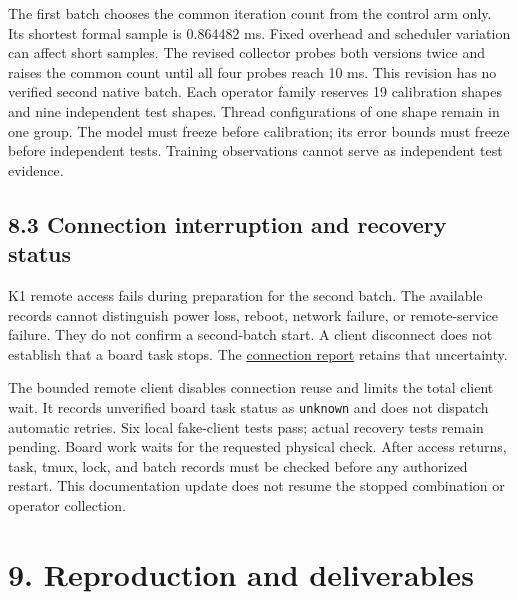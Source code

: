 \documentclass[10pt,a4paper]{article}
\begin{document}
The first batch chooses the common iteration count from the control arm
only. Its shortest formal sample is 0.864482 ms. Fixed overhead and
scheduler variation can affect short samples. The revised collector
probes both versions twice and raises the common count until all four
probes reach 10 ms. This revision has no verified second native batch.
Each operator family reserves 19 calibration shapes and nine independent
test shapes. Thread configurations of one shape remain in one group. The
model must freeze before calibration; its error bounds must freeze
before independent tests. Training observations cannot serve as
independent test evidence.

\hypertarget{connection-interruption-and-recovery-status}{%
\subsection{8.3 Connection interruption and recovery
status}\label{connection-interruption-and-recovery-status}}

K1 remote access fails during preparation for the second batch. The
available records cannot distinguish power loss, reboot, network
failure, or remote-service failure. They do not confirm a second-batch
start. A client disconnect does not establish that a board task stops.
The
\href{https://github.com/MoyaMryia/riscv-accl/blob/main/spacemit/reports/2026-10-12-k1-connection-interruption.md}{connection
report} retains that uncertainty.

The bounded remote client disables connection reuse and limits the total
client wait. It records unverified board task status as
\nolinkurl{unknown} and does not dispatch automatic retries. Six local
fake-client tests pass; actual recovery tests remain pending. Board work
waits for the requested physical check. After access returns, task,
tmux, lock, and batch records must be checked before any authorized
restart. This documentation update does not resume the stopped
combination or operator collection.

\hypertarget{reproduction-and-deliverables}{%
\section{9. Reproduction and
deliverables}\label{reproduction-and-deliverables}}
\end{document}
